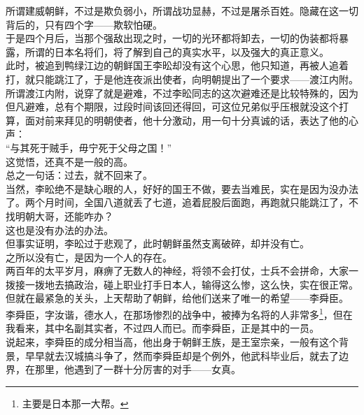 \begin{multicols}{\theparacolNo}
所谓建威朝鲜，不过是欺负弱小，所谓战功显赫，不过是屠杀百姓。隐藏在这一切背后的，只有四个字——欺软怕硬。\\

于是四个月后，当那个强敌出现之时，一切的光环都将卸去，一切的伪装都将暴露，所谓的日本名将们，将了解到自己的真实水平，以及强大的真正意义。\\

此时，被追到鸭绿江边的朝鲜国王李昖却没有这个心思，他只知道，再被人追着打，就只能跳江了，于是他连夜派出使者，向明朝提出了一个要求——渡江内附。\\

所谓渡江内附，说穿了就是避难，不过李昖同志的这次避难还是比较特殊的，因为但凡避难，总有个期限，过段时间该回还得回，可这位兄弟似乎压根就没这个打算，面对前来拜见的明朝使者，他十分激动，用一句十分真诚的话，表达了他的心声：\\

“与其死于贼手，毋宁死于父母之国！”\\

这觉悟，还真不是一般的高。\\

总之一句话：过去，就不回来了。\\

当然，李昖绝不是缺心眼的人，好好的国王不做，要去当难民，实在是因为没办法了。两个月时间，全国八道就丢了七道，追着屁股后面跑，再跑就只能跳江了，不找明朝大哥，还能咋办？\\

这也是没有办法的办法。\\

但事实证明，李昖过于悲观了，此时朝鲜虽然支离破碎，却并没有亡。\\

之所以没有亡，是因为一个人的存在。\\

两百年的太平岁月，麻痹了无数人的神经，将领不会打仗，士兵不会拼命，大家一拨接一拨地去搞政治，碰上职业打手日本人，输得这么惨，这么快，实在很正常。\\

但就在最紧急的关头，上天帮助了朝鲜，给他们送来了唯一的希望——李舜臣。\\

李舜臣，字汝谐，德水人，在那场惨烈的战争中，被捧为名将的人非常多\footnote{主要是日本那一大帮。}，但在我看来，其中名副其实者，不过四人而已。而李舜臣，正是其中的一员。\\

说起来，李舜臣的成分相当高，他出身于朝鲜王族，是王室宗亲，一般有这个背景，早早就去汉城搞斗争了，然而李舜臣却是个例外，他武科毕业后，就去了边界，在那里，他遇到了一群十分厉害的对手——女真。\\


\end{multicols}
